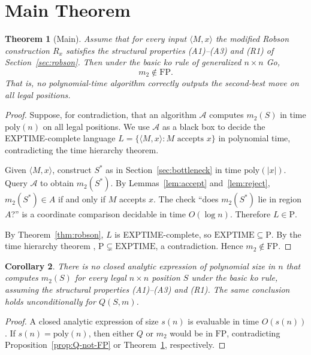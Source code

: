 \documentclass[11pt,a4paper]{amsart}
\theoremstyle{plain}
\newtheorem{theorem}{Theorem}[section]
\newtheorem{corollary}[theorem]{Corollary}
\theoremstyle{definition}
\theoremstyle{remark}
\newcommand{\FP}{\mathrm{FP}}
\newcommand{\PTIME}{\mathrm{P}}
\newcommand{\EXPTIME}{\mathrm{EXPTIME}}
\begin{document}
\section{Main Theorem}
\label{sec:main}

\begin{theorem}[Main]
\label{thm:main}
Assume that for every input $\langle M, x \rangle$ the modified Robson
construction $R_x$ satisfies the structural properties (A1)--(A3) and
(R1) of Section~\ref{sec:robson}. Then under the basic ko rule of
generalized $n \times n$ Go,
\[
  m_2 \notin \FP.
\]
That is, no polynomial-time algorithm correctly outputs the
second-best move on all legal positions.
\end{theorem}

\begin{proof}
Suppose, for contradiction, that an algorithm $\mathcal{A}$ computes
$m_2(S)$ in time $\mathrm{poly}(n)$ on all legal positions. We use
$\mathcal{A}$ as a black box to decide the EXPTIME-complete language
$L = \{\langle M, x\rangle : M \text{ accepts } x\}$ in polynomial
time, contradicting the time hierarchy theorem.

Given $\langle M, x \rangle$, construct $S^*$ as in
Section~\ref{sec:bottleneck} in time $\mathrm{poly}(|x|)$. Query
$\mathcal{A}$ to obtain $m_2(S^*)$. By
Lemmas~\ref{lem:accept} and~\ref{lem:reject}, $m_2(S^*) \in A$ if and
only if $M$ accepts $x$. The check ``does $m_2(S^*)$ lie in region
$A$?'' is a coordinate comparison decidable in time $O(\log n)$.
Therefore $L \in \PTIME$.

By Theorem~\ref{thm:robson}, $L$ is EXPTIME-complete, so
$\EXPTIME \subseteq \PTIME$. By the time hierarchy theorem
\cite{HS65}, $\PTIME \subsetneq \EXPTIME$, a contradiction.
Hence $m_2 \notin \FP$.
\end{proof}

\begin{corollary}
\label{cor:formulas}
There is no closed analytic expression of polynomial size in $n$ that
computes $m_2(S)$ for every legal $n \times n$ position $S$ under the
basic ko rule, assuming the structural properties (A1)--(A3) and (R1).
The same conclusion holds unconditionally for $Q(S, m)$.
\end{corollary}

\begin{proof}
A closed analytic expression of size $s(n)$ is evaluable in time
$O(s(n))$. If $s(n) = \mathrm{poly}(n)$, then either $Q$ or $m_2$
would be in $\FP$, contradicting Proposition~\ref{prop:Q-not-FP} or
Theorem~\ref{thm:main}, respectively.
\end{proof}
\end{document}
